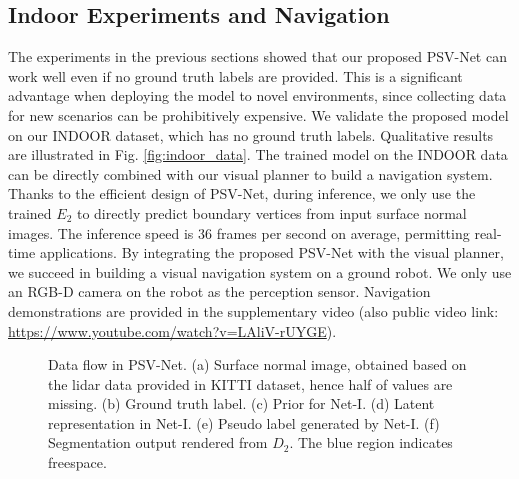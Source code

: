 \documentclass[letterpaper, 10 pt, journal, twoside]{ieeetran}
\begin{document}
\subsection{Indoor Experiments and Navigation}

The experiments in the previous sections showed that our proposed PSV-Net can work well even if no ground truth labels are provided. This is a significant advantage when deploying the model to novel environments, since collecting data for new scenarios can be prohibitively expensive. We validate the proposed model on our INDOOR dataset, which has no ground truth labels. Qualitative results are illustrated in Fig. \ref{fig:indoor_data}. The trained model on the INDOOR data can be directly combined with our visual planner to build a navigation system. Thanks to the efficient design of PSV-Net, during inference, we only use the trained $E_2$ to directly predict boundary vertices from input surface normal images. The inference speed is 36 frames per second on average, permitting real-time applications. 
By integrating the proposed PSV-Net with the visual planner, we succeed in building a visual navigation system on a ground robot. We only use an RGB-D camera on the robot as the perception sensor. Navigation demonstrations are provided in the supplementary video (also public video link: \url{https://www.youtube.com/watch?v=LAliV-rUYGE}). 


\begin{figure} \vspace{7pt}
{
  \centering
  \caption{\small Data flow in PSV-Net. (a) Surface normal image, obtained based on the lidar data provided in KITTI dataset, hence half of values are missing. (b) Ground truth label. (c) Prior for Net-I. (d) Latent representation in Net-I. (e) Pseudo label generated by Net-I. (f) Segmentation output rendered from $D_2$. The blue region indicates  freespace. %
  }
\label{fig:ablation}  
}
\end{figure}
\end{document}
